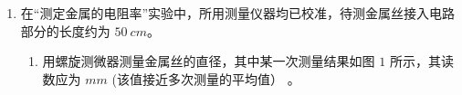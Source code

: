 \begin{enumerate}
\begin{enumerate}
\end{enumerate}




\item 
{}
在“测定金属的电阻率”实验中，所用测量仪器均已校准，待测金属丝接入电路部分的长度约为
$ 50 \ cm $。
\begin{figure}[h!]
\centering
\begin{subfigure}{0.4\linewidth}
\centering
 
\caption{}\label{}
\end{subfigure}
\begin{subfigure}{0.4\linewidth}
\centering
 
\caption{}\label{}
\end{subfigure}
\begin{subfigure}{0.4\linewidth}
\centering
 
\caption{}\label{}
\end{subfigure}
\begin{subfigure}{0.4\linewidth}
\centering
 
\caption{}\label{}
\end{subfigure}
\end{figure}

\begin{enumerate}
\item
用螺旋测微器测量金属丝的直径，其中某一次测量结果如图 $ 1 $ 所示，其读数应为
\underlinegap 
$ mm $
(该值接近多次测量的平均值）
。


\end{enumerate}
\end{enumerate}
